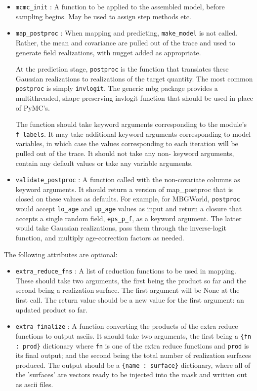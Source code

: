 \begin{itemize}
\item {} 
\texttt{mcmc{\_}init} : A function to be applied to the assembled model, before sampling begins.
May be used to assign step methods etc.

\item {} 
\texttt{map{\_}postproc} : When mapping and predicting, \texttt{make{\_}model} is not called. Rather, the mean
and covariance are pulled out of the trace and used to generate field realizations, with nugget
added as appropriate.

At the prediction stage, \texttt{postproc} is the function that translates these Gaussian
realizations to realizations of the target quantity. The most common \texttt{postproc} is simply
\texttt{invlogit}. The generic mbg package provides a multithreaded, shape-preserving invlogit
function that should be used in place of PyMC's.

The function should take keyword arguments corresponding to the module's \texttt{f{\_}labels}. It may
take additional keyword arguments corresponding to model variables, in which case the values
corresponding to each iteration will be pulled out of the trace. It should not take any non-
keyword arguments, contain any default values or take any variable arguments.

\item {} 
\texttt{validate{\_}postproc} : A function called with the non-covariate columns as keyword arguments.
It should return a version of map{\_}postproc that is closed on these values as defaults. For example,
for MBGWorld, \texttt{postproc} would accept \texttt{lo{\_}age} and \texttt{up{\_}age} values as input and return a
closure that accepts a single random field, \texttt{eps{\_}p{\_}f}, as a keyword argument. The latter would
take Gaussian realizations, pass them through the inverse-logit function, and multiply
age-correction factors as needed.

\end{itemize}

The following attributes are optional:
\begin{itemize}
\item {} 
\texttt{extra{\_}reduce{\_}fns} : A list of reduction functions to be used in mapping. These should take two
arguments, the first being the product so far and the second being a realization surface. The
first argument will be None at the first call. The return value should be a new value for the
first argument: an updated product so far.

\item {} 
\texttt{extra{\_}finalize} : A function converting the products of the extra reduce functions to output
asciis. It should take two arguments, the first being a \texttt{{\{}fn : prod{\}}} dictionary where \texttt{fn}
is one of the extra reduce functions and \texttt{prod} is its final output; and the second being the
total number of realization surfaces produced. The output should be a \texttt{{\{}name : surface{\}}}
dictionary, where all of the 'surfaces' are vectors ready to be injected into the mask and
written out as ascii files.

\end{itemize}

